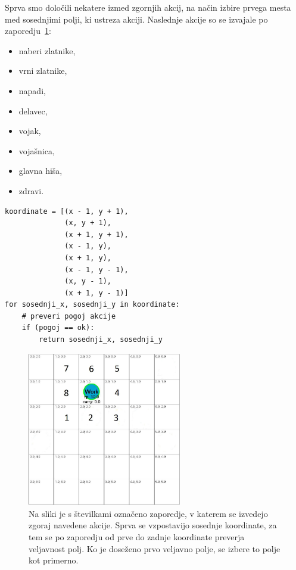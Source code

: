 \documentclass[a4paper, 12pt]{book}
\begin{document}
Sprva smo določili nekatere izmed zgornjih akcij, na način izbire prvega mesta med sosednjimi polji, ki ustreza akciji. 
Naslednje akcije so se izvajale po zaporedju~\ref{pickorakiPreverjanja}:
\begin{itemize}
	\item naberi zlatnike,
	\item vrni zlatnike,
	\item napadi,
	\item delavec,
	\item vojak, 
	\item vojašnica,
	\item glavna hiša,
	\item zdravi.
\end{itemize}
\begin{verbatim}
koordinate = [(x - 1, y + 1),
              (x, y + 1),
              (x + 1, y + 1),
              (x - 1, y),
              (x + 1, y),
              (x - 1, y - 1),
              (x, y - 1),
              (x + 1, y - 1)]
for sosednji_x, sosednji_y in koordinate:
    # preveri pogoj akcije
    if (pogoj == ok):
        return sosednji_x, sosednji_y
\end{verbatim}

\begin{figure}[h!]
	\begin{center}
		\includegraphics[width=0.6\textwidth]{photos/korakiPreverjanja.pdf}
	\end{center}
	\caption{Na sliki je s številkami označeno zaporedje, v katerem se izvedejo zgoraj navedene akcije. Sprva se vzpostavijo sosednje koordinate, za tem se po zaporedju od prve do zadnje koordinate preverja veljavnost polj. Ko je doseženo prvo veljavno polje, se izbere to polje kot primerno. }
	\label{pickorakiPreverjanja}
\end{figure}
\end{document}
